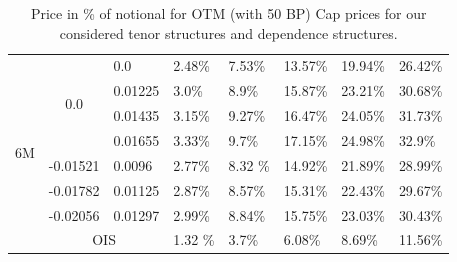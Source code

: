 \documentclass[12pt]{article}
\begin{document}
\begin{table}[H]
\begin{tabular}{|c||c||c||c|c|c|c|c|}
    \multirow{8}{*}{6M}& \multirow{4}{*}{0.0} & \multicolumn{1}{l||}{0.0}               & \multicolumn{1}{l|}{2.48\%}    & \multicolumn{1}{l|}{7.53\%}   & \multicolumn{1}{l|}{13.57\%} & \multicolumn{1}{l|}{19.94\%} & \multicolumn{1}{l|}{26.42\%}\\\cline{3-8}
                        &                          & \multicolumn{1}{l||}{0.01225}      & \multicolumn{1}{l|}{3.0\%} & \multicolumn{1}{l|}{8.9\%}      & \multicolumn{1}{l|}{15.87\%} & \multicolumn{1}{l|}{23.21\%} & \multicolumn{1}{l|}{30.68\%}\\\cline{3-8}
                        &                          & \multicolumn{1}{l||}{0.01435}      & \multicolumn{1}{l|}{3.15\%} &  \multicolumn{1}{l|}{9.27\%}     & \multicolumn{1}{l|}{16.47\%} & \multicolumn{1}{l|}{24.05\%} & \multicolumn{1}{l|}{31.73\%}\\\cline{3-8}
                        &                          & \multicolumn{1}{l||}{0.01655}      & \multicolumn{1}{l|}{3.33\%} &   \multicolumn{1}{l|}{9.7\%}    & \multicolumn{1}{l|}{17.15\%} & \multicolumn{1}{l|}{24.98\%} & \multicolumn{1}{l|}{32.9\%}\\\cline{2-8}
                        & \multicolumn{1}{l||}{-0.01521} & \multicolumn{1}{l||}{0.0096} & \multicolumn{1}{l|}{2.77\%} & \multicolumn{1}{l|}{8.32 \%}      & \multicolumn{1}{l|}{14.92\%} & \multicolumn{1}{l|}{21.89\%} & \multicolumn{1}{l|}{28.99\%}\\\cline{2-8}
                        & \multicolumn{1}{l||}{-0.01782} & \multicolumn{1}{l||}{0.01125} & \multicolumn{1}{l|}{2.87\%} & \multicolumn{1}{l|}{8.57\%}     & \multicolumn{1}{l|}{15.31\%} & \multicolumn{1}{l|}{22.43\%} & \multicolumn{1}{l|}{29.67\%}\\\cline{2-8}
                        & \multicolumn{1}{l||}{-0.02056} & \multicolumn{1}{l||}{0.01297} & \multicolumn{1}{l|}{2.99\%} & \multicolumn{1}{l|}{8.84\%}     & \multicolumn{1}{l|}{15.75\%} & \multicolumn{1}{l|}{23.03\%} & \multicolumn{1}{l|}{30.43\%}\\\cline{2-8}
                        &  \multicolumn{2}{|c||}{OIS}                                   &  \multicolumn{1}{l|}{1.32 \%} & \multicolumn{1}{l|}{3.7\%}      & \multicolumn{1}{l|}{6.08\%} & \multicolumn{1}{l|}{8.69\%} & \multicolumn{1}{l|}{11.56\%}\\ \hline
     \end{tabular}
    \caption{Price in \% of notional for OTM (with 50 BP) Cap prices for our considered tenor structures
    and dependence structures.}
    \label{tab:OTMCapPrice}
\end{table}
\end{document}
